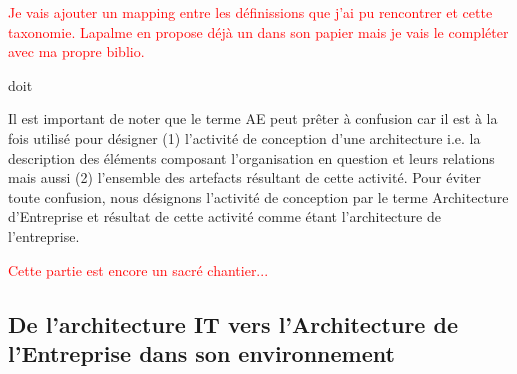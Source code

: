 \textcolor{red}{Je vais ajouter un mapping entre les définissions que j'ai pu 
rencontrer et cette taxonomie. Lapalme en propose déjà un dans son papier mais 
je vais le compléter avec ma propre biblio.}









%
%
doit 
%
%


Il est important de noter que le terme AE peut prêter à confusion car il est à 
la fois utilisé pour désigner (1) l'activité de conception d'une architecture 
i.e. la description des éléments composant l'organisation en question et leurs 
relations mais aussi (2) l'ensemble des artefacts résultant de cette activité. 
Pour éviter toute confusion, nous désignons l'activité de conception par le 
terme Architecture d'Entreprise et résultat de cette activité comme étant 
l'architecture de l'entreprise.

\textcolor{red}{Cette partie est encore un sacré chantier...}


\subsection{De l'architecture IT vers l'Architecture de l'Entreprise dans son 
environnement}

